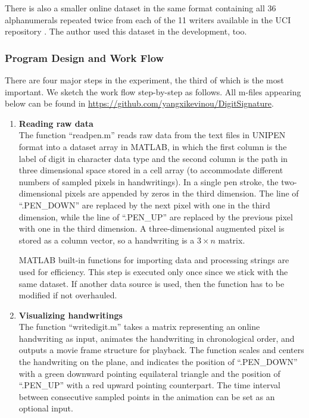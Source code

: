 \documentclass[fleqn]{article}
\theoremstyle{definition}
\theoremstyle{remark}
\begin{document}
\par
There is also a smaller online dataset in the same format containing all 36 alphanumerals repeated twice from each of the 11 writers available in the UCI repository \cite{UJIchar}. The author used this dataset in the development, too.

\subsubsection{Program Design and Work Flow}

There are four major steps in the experiment, the third of which is the most important. We sketch the work flow step-by-step as follows. All m-files appearing below can be found in \url{https://github.com/yangxikevinou/DigitSignature}.
\begin{enumerate}
\item \textbf{Reading raw data} \\
The function ``readpen.m'' reads raw data from the text files in UNIPEN format into a dataset array in MATLAB, in which the first column is the label of digit in character data type and the second column is the path in three dimensional space stored in a cell array (to accommodate different numbers of sampled pixels in handwritings). In a single pen stroke, the two-dimensional pixels are appended by zeros in the third dimension. The line of ``.PEN\_DOWN'' are replaced by the next pixel with one in the third dimension, while the line of ``.PEN\_UP'' are replaced by the previous pixel with one in the third dimension. A three-dimensional augmented pixel is stored as a column vector, so a handwriting is a $3\times n$ matrix.

\par
MATLAB built-in functions for importing data and processing strings are used for efficiency. This step is executed only once since we stick with the same dataset. If another data source is used, then the function has to be modified if not overhauled.

\item \textbf{Visualizing handwritings} \\
The function ``writedigit.m'' takes a matrix representing an online handwriting as input, animates the handwriting in chronological order, and outputs a movie frame structure for playback. The function scales and centers the handwriting on the plane, and indicates the position of ``.PEN\_DOWN'' with a green downward pointing equilateral triangle and the position of ``.PEN\_UP'' with a red upward pointing counterpart. The time interval between consecutive sampled points in the animation can be set as an optional input.


\end{enumerate}
\end{document}
